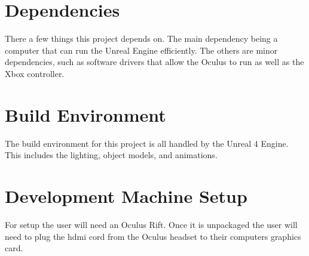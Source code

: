 \section{Dependencies}
There a few things this project depends on.  The main dependency being a computer that can run the Unreal Engine efficiently.  The others are minor dependencies, such as software drivers that allow the Oculus to run as well as the Xbox controller.

\section{Build  Environment}
The build environment for this project is all handled by the Unreal 4 Engine.  This includes the lighting, object models, and animations.

\section{Development Machine Setup}
For setup the user will need an Oculus Rift. Once it is unpackaged the user will need to plug the hdmi cord from the Oculus headset to their computers graphics card. 


